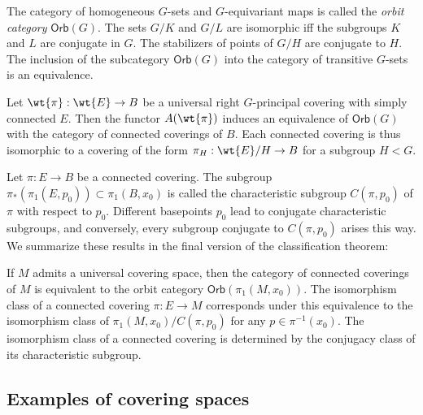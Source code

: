 The category of homogeneous $G$-sets and $G$-equivariant maps is called the \emph{orbit category} $\mathsf{Orb}(G)$. The sets $G\slash K$ and $G\slash L$ are isomorphic iff the subgroups $K$ and $L$ are conjugate in $G$. The stabilizers of points of $G\slash H$ are conjugate to $H$. The inclusion of the subcategory $\mathsf{Orb}(G)$ into the category of transitive $G$-sets is an equivalence.

Let $\wt{\pi}:\wt{E}\to B$ be a universal right $G$-principal covering with simply connected $E$. Then the functor $A(\wt{\pi})$ induces an equivalence of $\mathsf{Orb}(G)$ with the category of connected coverings of $B$. Each connected covering is thus isomorphic to a covering of the form $\pi_H:\wt{E}\slash H\to B$ for a subgroup $H<G$.

Let $\pi:E\to B$ be a connected covering. The subgroup $\pi_\ast(\pi_1(E,p_0))\subset \pi_1(B,x_0)$ is called the characteristic subgroup $C(\pi,p_0)$ of $\pi$ with respect to $p_0$. Different basepoints $p_0$ lead to conjugate characteristic subgroups, and conversely, every subgroup conjugate to $C(\pi,p_0)$ arises this way. We summarize these results in the final version of the classification theorem:

\begin{thm}
    If $M$ admits a universal covering space, then the category of connected coverings of $M$ is equivalent to the orbit category $\mathsf{Orb}(\pi_1(M,x_0))$. The isomorphism class of a connected covering $\pi:E\to M$ corresponds under this equivalence to the isomorphism class of $\pi_1(M,x_0)\slash C(\pi,p_0)$ for any $p\in\pi^{-1}(x_0)$. The isomorphism class of a connected covering is determined by the conjugacy class of its characteristic subgroup.
\end{thm}







\subsection{Examples of covering spaces}

